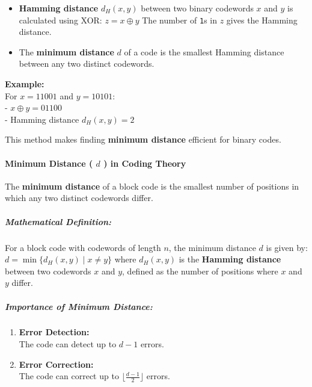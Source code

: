 \documentclass[11pt]{article}
\begin{document}
\begin{itemize}
\item
  \textbf{Hamming distance} \(d_H(x, y)\) between two binary codewords
  \(x\) and \(y\) is calculated using XOR: \(z = x \oplus y\) The number
  of \texttt{1}s in \(z\) gives the Hamming distance.
\item
  The \textbf{minimum distance} \(d\) of a code is the smallest Hamming
  distance between any two distinct codewords.
\end{itemize}

\textbf{Example:}\\
For \(x = 11001\) and \(y = 10101\):\\
- \(x \oplus y = 01100\)\\
- Hamming distance \(d_H(x, y) = 2\)

This method makes finding \textbf{minimum distance} efficient for binary
codes.

\paragraph{\texorpdfstring{\textbf{Minimum Distance ( \(d\) ) in Coding
Theory}}{Minimum Distance ( d ) in Coding Theory}}\label{minimum-distance-d-in-coding-theory}

The \textbf{minimum distance} of a block code is the smallest number of
positions in which any two distinct codewords differ.

\subparagraph{\texorpdfstring{\textbf{Mathematical
Definition:}}{Mathematical Definition:}}\label{mathematical-definition}

For a block code with codewords of length \(n\), the minimum distance
\(d\) is given by: \(d = \min \{ d_H(x, y) \mid x \neq y \}\) where
\(d_H(x, y)\) is the \textbf{Hamming distance} between two codewords
\(x\) and \(y\), defined as the number of positions where \(x\) and
\(y\) differ.

\subparagraph{\texorpdfstring{\textbf{Importance of Minimum
Distance:}}{Importance of Minimum Distance:}}\label{importance-of-minimum-distance}

\begin{enumerate}
\def\labelenumi{\arabic{enumi}.}
\item
  \textbf{Error Detection:}\\
  The code can detect up to \(d - 1\) errors.
\item
  \textbf{Error Correction:}\\
  The code can correct up to \(\lfloor \frac{d - 1}{2} \rfloor\) errors.
\end{enumerate}
\end{document}

